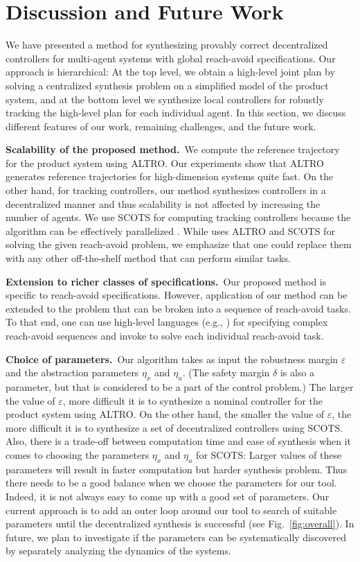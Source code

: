 \section{Discussion and Future Work}
We have presented a method for synthesizing provably correct decentralized controllers for multi-agent systems with global reach-avoid specifications. 
Our approach is hierarchical: At the top level, we obtain a high-level joint plan by solving a centralized synthesis problem on a simplified model of the product system, and at the bottom level we synthesize local controllers for robustly tracking the high-level plan for each individual agent.
In this section, we discuss different features of our work, remaining challenges, and the future work.

\smallskip
\noindent\textbf{Scalability of the proposed method.}\
We compute the reference trajectory for the product system using ALTRO. Our experiments show that ALTRO generates reference trajectories for high-dimension systems quite fast. On the other hand, for tracking controllers, our method synthesizes controllers in a decentralized manner and thus scalability is not affected by increasing the number of agents. We use SCOTS for computing tracking controllers because the algorithm can be effectively parallelized \cite{KhaledZ19pfaces}. While \tool uses ALTRO and SCOTS for solving the given reach-avoid problem, we emphasize that one could replace them with any other off-the-shelf method that can perform similar tasks.

\smallskip
\noindent\textbf{Extension to richer classes of specifications.}\
Our proposed method is specific to reach-avoid specifications. However, application of our method can be extended to the problem that can be broken into a sequence of reach-avoid tasks. To that end, one can use high-level languages (e.g., \cite{Majumdar2020,Ghosh2020}) for specifying complex reach-avoid sequences and invoke \tool to solve each individual reach-avoid task.

\smallskip
\noindent\textbf{Choice of parameters.}\
Our algorithm takes as input the robustness margin $\varepsilon$ and the abstraction parameters $\eta_x$ and $\eta_u$.
(The safety margin $\delta$ is also a parameter, but that is considered to be a part of the control problem.)
The larger the value of $\varepsilon$, more difficult it is to synthesize a nominal controller for the product system using ALTRO.
On the other hand, the smaller the value of $\varepsilon$, the more difficult it is to synthesize a set of decentralized controllers using SCOTS.
Also, there is a trade-off between computation time and ease of synthesis when it comes to choosing the parameters $\eta_x$ and $\eta_u$ for SCOTS: Larger values of these parameters will result in faster computation but harder synthesis problem.
Thus there needs to be a good balance when we choose the parameters for our tool.
Indeed, it is not always easy to come up with a good set of parameters.
Our current approach is to add an outer loop around our tool to search of suitable parameters until the decentralized synthesis is successful (see Fig.~\ref{fig:overall}).
In future, we plan to investigate if the parameters can be systematically discovered by separately analyzing the dynamics of the systems.

